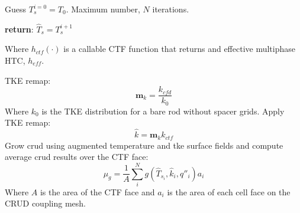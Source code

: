     \begin{algorithm}[H]
    Guess $T^{i=0}_s=T_0$.  Maximum number, $N$ iterations.

        \textbf{return}: $\hat T_s = T^{i+1}_s$
        \end{algorithm}
    Where $h_{ctf}(\cdot)$ is a callable CTF function that returns and effective multiphase HTC, $h_{eff}$.

    TKE remap:
    \begin{equation}
       \mathbf m_{k} = \frac{k_{cfd}}{k_{0}}
    \end{equation}
    Where $k_0$ is the TKE distribution for a bare rod without spacer grids.
    Apply TKE remap:
       \begin{equation}
       \hat k = \mathbf m_k k_{ctf}
       \end{equation}
     Grow crud using augmented temperature and tke surface fields and compute average crud results over the CTF face:
     \begin{equation}
     \mu_g = \frac{1}{A} \sum_i^N g(\hat T_{s_i}, \hat k_i, q''_i) a_i
     \end{equation}
    Where $A$ is the area of the CTF face and $a_i$ is the area of each cell face on the CRUD coupling mesh.

